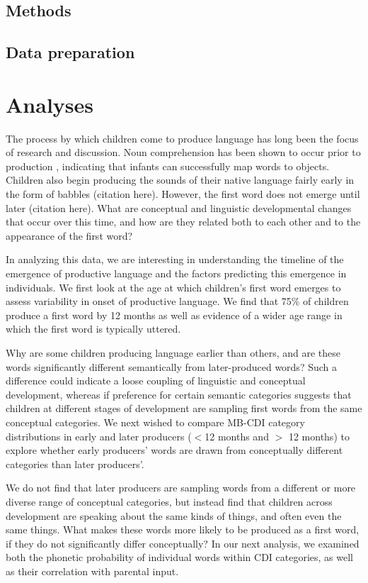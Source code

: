 \documentclass[10pt,letterpaper]{article}
\begin{document}
\subsection{Methods}

\subsection{Data preparation}

\section{Analyses}
The process by which children come to produce language has long been the focus of research and discussion. Noun comprehension has been shown to occur prior to production \cite{tincoff1999,tincoff2012,bergelson2012}, indicating that infants can successfully map words to objects. Children also begin producing the sounds of their native language fairly early in the form of babbles (citation here). However, the first word does not emerge until later (citation here). What are conceptual and linguistic developmental changes that occur over this time, and how are they related both to each other and to the appearance of the first word?

In analyzing this data, we are interesting in understanding the timeline of the emergence of productive language and the factors predicting this emergence in individuals. We first look at the age at which children's first word emerges to assess variability in onset of productive language. We find that 75\% of children produce a first word by 12 months as well as evidence of a wider age range in which the first word is typically uttered.

Why are some children producing language earlier than others, and are these words significantly different semantically from later-produced words? Such a difference could indicate a loose coupling of linguistic and conceptual development, whereas if preference for certain semantic categories suggests that children at different stages of development are sampling first words from the same conceptual categories. We next wished to compare MB-CDI category distributions in early and later producers ($<$12 months and $>$ 12 months) to explore whether early producers' words are drawn from conceptually different categories than later producers'.

We do not find that later producers are sampling words from a different or more diverse range of conceptual categories, but instead find that children across development are speaking about the same kinds of things, and often even the same things. What makes these words more likely to be produced as a first word, if they do not significantly differ conceptually? In our next analysis, we examined both the phonetic probability of individual words within CDI categories, as well as their correlation with parental input.
\end{document}
